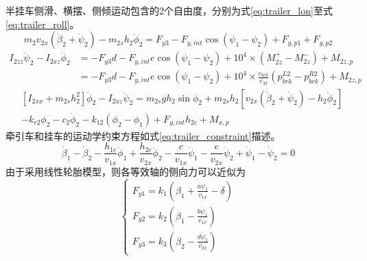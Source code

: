        半挂车侧滑、横摆、侧倾运动包含的2个自由度，分别为式\eqref{eq:trailer_lon}至式\eqref{eq:trailer_roll}。
        \begin{equation}
        m_2 v_{2x}(\dot{\beta}_2 + \dot{\psi}_2) - m_{2s} h_2 \ddot{\phi}_2 = F_{y3} - F_{y,int} \cos(\psi_1 - \psi_2) + F_{y,p1} + F_{y,p2}
        \label{eq:trailer_lon}
        \end{equation}
        \begin{equation}
        \begin{aligned}
        I_{2zz} \ddot{\psi}_2 - I_{2xz} \ddot{\phi}_2 &= -F_{y3} d - F_{y,int} e \cos(\psi_1 - \psi_2) + 10^4 \times (M_{2z}^+ - M_{2z}^-) + M_{2z,p} \\
        &= -F_{y3} d - F_{y,int} e \cos(\psi_1 - \psi_2) + 10^4 \times \frac{c_{brk}}{\overline{c_M}} \left(p_{brk}^{L2} - p_{brk}^{R2}\right) + M_{2z,p}
        \end{aligned}
        \label{eq:trailer_yaw}
        \end{equation}
        \begin{equation}
        \begin{aligned}
        &[I_{2xx} + m_{2s} h_2^2] \ddot{\phi}_2 - I_{2xz} \ddot{\psi}_2 = m_{2s} g h_2 \sin \phi_2 + m_{2s} h_2 \left[ v_{2x}(\dot{\beta}_2 + \dot{\psi}_2) - h_2 \ddot{\phi}_2 \right] \\
        &- k_{r2} \phi_2 - c_2 \dot{\phi}_2 - k_{12}(\phi_2 - \phi_1) + F_{y,int} h_{2c} + M_{x,p}
        \end{aligned}
        \label{eq:trailer_roll}
        \end{equation}
        牵引车和挂车的运动学约束方程如式\eqref{eq:trailer_constraint}描述。
        \begin{equation}
        \dot{\beta}_1 - \dot{\beta}_2 - \frac{h_{1c}}{v_{1x}} \ddot{\phi}_1 + \frac{h_{2c}}{v_{2x}} \ddot{\phi}_2 - \frac{c}{v_{1x}} \ddot{\psi}_1 - \frac{e}{v_{2x}} \ddot{\psi}_2 + \dot{\psi}_1 - \dot{\psi}_2 = 0
        \label{eq:trailer_constraint}
        \end{equation}
        由于采用线性轮胎模型，则各等效轴的侧向力可以近似为
        \begin{equation}
        \begin{cases}
        F_{y1} = k_1 \left( \beta_1 + \frac{a \dot{\psi}_1}{v_{1x}} - \delta \right) \\
        F_{y2} = k_2 \left( \beta_1 - \frac{b \dot{\psi}_1}{v_{1x}} \right) \\
        F_{y3} = k_3 \left( \beta_2 - \frac{d \dot{\psi}_1}{v_{2x}} \right)
        \end{cases}
        \end{equation}
